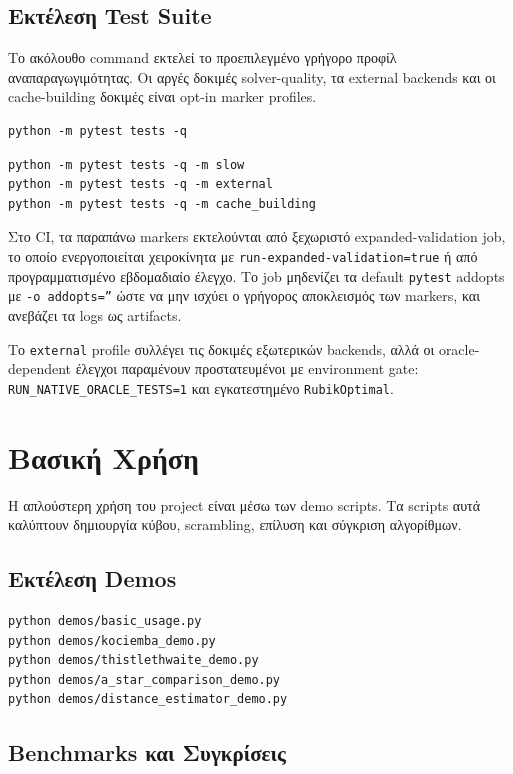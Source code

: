 \subsection{Εκτέλεση Test Suite}

Το ακόλουθο command εκτελεί το προεπιλεγμένο γρήγορο προφίλ αναπαραγωγιμότητας.
Οι αργές δοκιμές solver-quality, τα external backends και οι cache-building
δοκιμές είναι opt-in marker profiles.

\begin{lstlisting}
python -m pytest tests -q
\end{lstlisting}

\begin{lstlisting}
python -m pytest tests -q -m slow
python -m pytest tests -q -m external
python -m pytest tests -q -m cache_building
\end{lstlisting}

Στο CI, τα παραπάνω markers εκτελούνται από ξεχωριστό expanded-validation job,
το οποίο ενεργοποιείται χειροκίνητα με \texttt{run-expanded-validation=true} ή
από προγραμματισμένο εβδομαδιαίο έλεγχο. Το job μηδενίζει τα default
\texttt{pytest} addopts με \texttt{-o addopts=''} ώστε να μην ισχύει ο γρήγορος
αποκλεισμός των markers, και ανεβάζει τα logs ως artifacts.

Το \texttt{external} profile συλλέγει τις δοκιμές εξωτερικών backends, αλλά οι
oracle-dependent έλεγχοι παραμένουν προστατευμένοι με environment gate:
\texttt{RUN\_NATIVE\_ORACLE\_TESTS=1} και εγκατεστημένο \texttt{RubikOptimal}.

\section{Βασική Χρήση}

Η απλούστερη χρήση του project είναι μέσω των demo scripts. Τα scripts αυτά καλύπτουν δημιουργία κύβου, scrambling, επίλυση και σύγκριση αλγορίθμων.

\subsection{Εκτέλεση Demos}
\begin{lstlisting}
python demos/basic_usage.py
python demos/kociemba_demo.py
python demos/thistlethwaite_demo.py
python demos/a_star_comparison_demo.py
python demos/distance_estimator_demo.py
\end{lstlisting}

\subsection{Benchmarks και Συγκρίσεις}

